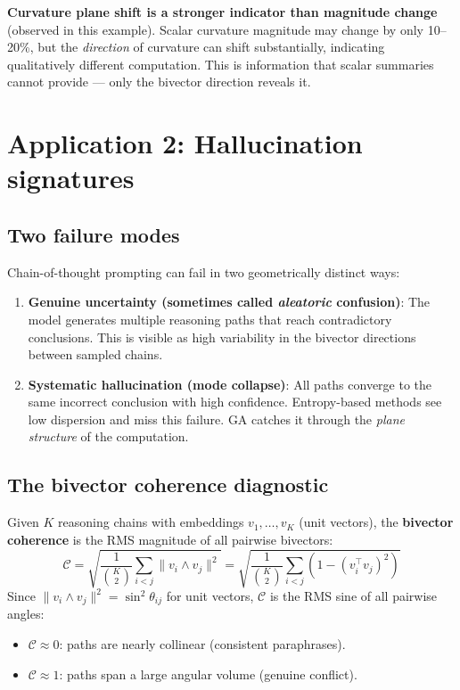 \documentclass[11pt, twoside, openright]{memoir}
\newcommand{\op}{\wedge}          %
\begin{document}
\begin{finding}
\textbf{Curvature plane shift is a stronger indicator than magnitude
change} (observed in this example).  Scalar curvature magnitude may
change by only 10--20\%, but the \emph{direction} of curvature can
shift substantially, indicating
qualitatively different computation.  This is information that scalar
summaries cannot provide --- only the bivector direction reveals it.
\end{finding}

\section{Application 2: Hallucination signatures}
\label{sec:hallucination}

\subsection{Two failure modes}

Chain-of-thought prompting can fail in two geometrically distinct ways:

\begin{enumerate}[nosep]
\item \textbf{Genuine uncertainty (sometimes called \emph{aleatoric} confusion)}: The model generates multiple
  reasoning paths that reach contradictory conclusions.  This is
  visible as high variability in the bivector directions between
  sampled chains.
\item \textbf{Systematic hallucination (mode collapse)}: All paths
  converge to the same incorrect conclusion with high confidence.
  Entropy-based methods see low dispersion and miss this failure.
  GA catches it through the \emph{plane structure} of the computation.
\end{enumerate}

\subsection{The bivector coherence diagnostic}

Given $K$ reasoning chains with embeddings $v_1, \ldots, v_K$ (unit
vectors), the \textbf{bivector coherence} is the RMS magnitude of
all pairwise bivectors:
\[
  \mathcal{C} = \sqrt{\frac{1}{\binom{K}{2}}
  \sum_{i < j} \|v_i \op v_j\|^2}
  = \sqrt{\frac{1}{\binom{K}{2}}
  \sum_{i < j} (1 - (v_i^\top v_j)^2)}
\]
Since $\|v_i \op v_j\|^2 = \sin^2\theta_{ij}$ for unit vectors,
$\mathcal{C}$ is the RMS sine of all pairwise angles:
\begin{itemize}[nosep]
\item $\mathcal{C} \approx 0$: paths are nearly collinear
  (consistent paraphrases).
\item $\mathcal{C} \approx 1$: paths span a large angular volume
  (genuine conflict).
\end{itemize}
\end{document}
